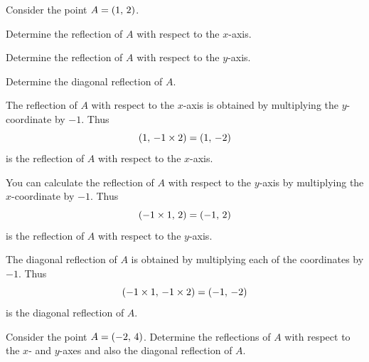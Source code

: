 \documentclass[a4paper,oneside,12pt]{article}
\begin{document}
\begin{example}
Consider the point $A = \left\lparen{1},\, {2}\right\rparen$.
\begin{packedenum}
\item\label{subex:point_1_2_reflection_x_axis}
  Determine the reflection of $A$ with respect to the $x$-axis.

\item\label{subex:point_1_2_reflection_y_axis}
  Determine the reflection of $A$ with respect to the $y$-axis.

\item\label{subex:point_1_2_reflection_diagonal}
  Determine the diagonal reflection of $A$.
\end{packedenum}
\end{example}

\begin{solution}
The reflection of $A$ with respect to the $x$-axis is obtained by
multiplying the $y$-coordinate by $-1$.  Thus
\[
\left\lparen{1},\, {-1 \times 2}\right\rparen
=
\left\lparen{1},\, {-2}\right\rparen
\]
is the reflection of $A$ with respect to the $x$-axis.

You can calculate the reflection of $A$ with respect to the $y$-axis
by multiplying the $x$-coordinate by $-1$.  Thus
\[
\left\lparen{-1 \times 1},\, {2}\right\rparen
=
\left\lparen{-1},\, {2}\right\rparen
\]
is the reflection of $A$ with respect to the $y$-axis.

The diagonal reflection of $A$ is obtained by multiplying each of the
coordinates by $-1$.  Thus
\[
\left\lparen{-1 \times 1},\, {-1 \times 2}\right\rparen
=
\left\lparen{-1},\, {-2}\right\rparen
\]
is the diagonal reflection of $A$.
\end{solution}

\begin{exercise}
Consider the point $A = \left\lparen{-2},\, {4}\right\rparen$.  Determine the reflections of
$A$ with respect to the $x$- and $y$-axes and also the diagonal
reflection of $A$.
\end{exercise}
\end{document}
